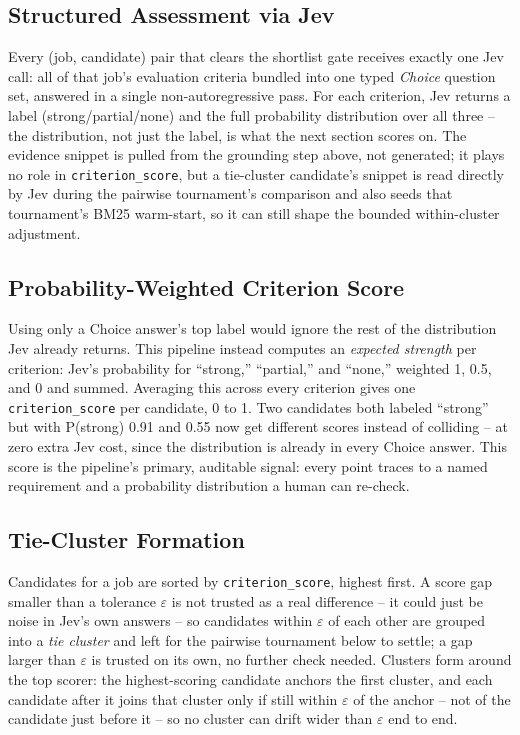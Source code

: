 \documentclass[journal]{IEEEtran}
\begin{document}
\subsection{Structured Assessment via Jev}
Every (job, candidate) pair that clears the shortlist gate receives exactly one Jev call: all of that job's evaluation criteria bundled into one typed \emph{Choice} question set, answered in a single non-autoregressive pass. For each criterion, Jev returns a label (strong/partial/none) and the full probability distribution over all three -- the distribution, not just the label, is what the next section scores on. The evidence snippet is pulled from the grounding step above, not generated; it plays no role in \texttt{criterion\_score}, but a tie-cluster candidate's snippet is read directly by Jev during the pairwise tournament's comparison and also seeds that tournament's BM25 warm-start, so it can still shape the bounded within-cluster adjustment.

\subsection{Probability-Weighted Criterion Score}
Using only a Choice answer's top label would ignore the rest of the distribution Jev already returns. This pipeline instead computes an \emph{expected strength} per criterion: Jev's probability for ``strong,'' ``partial,'' and ``none,'' weighted 1, 0.5, and 0 and summed. Averaging this across every criterion gives one \texttt{criterion\_score} per candidate, 0 to 1. Two candidates both labeled ``strong'' but with P(strong) 0.91 and 0.55 now get different scores instead of colliding -- at zero extra Jev cost, since the distribution is already in every Choice answer. This score is the pipeline's primary, auditable signal: every point traces to a named requirement and a probability distribution a human can re-check.

\subsection{Tie-Cluster Formation}
Candidates for a job are sorted by \texttt{criterion\_score}, highest first. A score gap smaller than a tolerance $\varepsilon$ is not trusted as a real difference -- it could just be noise in Jev's own answers -- so candidates within $\varepsilon$ of each other are grouped into a \emph{tie cluster} and left for the pairwise tournament below to settle; a gap larger than $\varepsilon$ is trusted on its own, no further check needed. Clusters form around the top scorer: the highest-scoring candidate anchors the first cluster, and each candidate after it joins that cluster only if still within $\varepsilon$ of the anchor -- not of the candidate just before it -- so no cluster can drift wider than $\varepsilon$ end to end.
\end{document}
